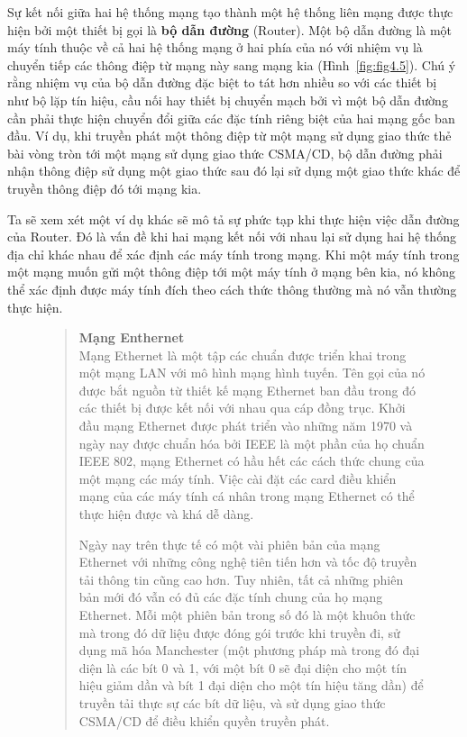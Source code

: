 Sự kết nối giữa hai hệ thống mạng tạo thành một hệ thống liên mạng được thực hiện bởi một
thiết bị gọi là \textbf{bộ dẫn đường} (Router). Một bộ dẫn đường là một máy tính thuộc về
cả hai hệ thống mạng ở hai phía của nó với nhiệm vụ là chuyển tiếp các thông điệp từ mạng
này sang mạng kia (Hình~\ref{fig:fig4.5}). Chú ý rằng nhiệm vụ của bộ dẫn đường đặc biệt
to tát hơn nhiều so với các thiết bị như bộ lặp tín hiệu, cầu nối hay thiết bị chuyển mạch
bởi vì một bộ dẫn đường cần phải thực hiện chuyển đổi giữa các đặc tính riêng biệt của hai
mạng gốc ban đầu. Ví dụ, khi truyền phát một thông điệp từ một mạng sử dụng giao thức thẻ
bài vòng tròn tới một mạng sử dụng giao thức CSMA/CD, bộ dẫn đường phải nhận thông điệp sử
dụng một giao thức sau đó lại sử dụng một giao thức khác để truyền thông điệp đó tới mạng
kia.


Ta sẽ xem xét một ví dụ khác sẽ mô tả sự phức tạp khi thực hiện việc dẫn đường của
Router. Đó là vấn đề khi hai mạng kết nối với nhau lại sử dụng hai hệ thống địa chỉ khác
nhau để xác định các máy tính trong mạng. Khi một máy tính trong một mạng muốn gửi một
thông điệp tới một máy tính ở mạng bên kia, nó không thể xác định được máy tính đích theo
cách thức thông thường mà nó vẫn thường thực hiện.

\begin{figure}[t]
  \begin{quotation}
    \noindent
    \textbf{Mạng Enthernet} \vspace{0.3cm}
    \\
    Mạng Ethernet là một tập các chuẩn được triển khai trong một mạng LAN với mô hình mạng
    hình tuyến. Tên gọi của nó được bắt nguồn từ thiết kế mạng Ethernet ban đầu trong đó
    các thiết bị được kết nối với nhau qua cáp đồng trục. Khởi đầu mạng Ethernet được phát
    triển vào những năm 1970 và ngày nay được chuẩn hóa bởi IEEE là một phần của họ chuẩn
    IEEE 802, mạng Ethernet có hầu hết các cách thức chung của một mạng các máy tính. Việc
    cài đặt các card điều khiển mạng của các máy tính cá nhân trong mạng Ethernet có thể
    thực hiện được và khá dễ dàng.

    Ngày nay trên thực tế có một vài phiên bản của mạng Ethernet với những công nghệ tiên
    tiến hơn và tốc độ truyền tải thông tin cũng cao hơn. Tuy nhiên, tất cả những phiên
    bản mới đó vẫn có đủ các đặc tính chung của họ mạng Ethernet. Mỗi một phiên bản trong
    số đó là một khuôn thức mà trong đó dữ liệu được đóng gói trước khi truyền đi, sử dụng
    mã hóa Manchester (một phương pháp mà trong đó đại diện là các bít 0 và 1, với một bít
    0 sẽ đại diện cho một tín hiệu giảm dần và bít 1 đại diện cho một tín hiệu tăng dần)
    để truyền tải thực sự các bít dữ liệu, và sử dụng giao thức CSMA/CD để điều khiển
    quyền truyền phát.
  \end{quotation}
\end{figure}

